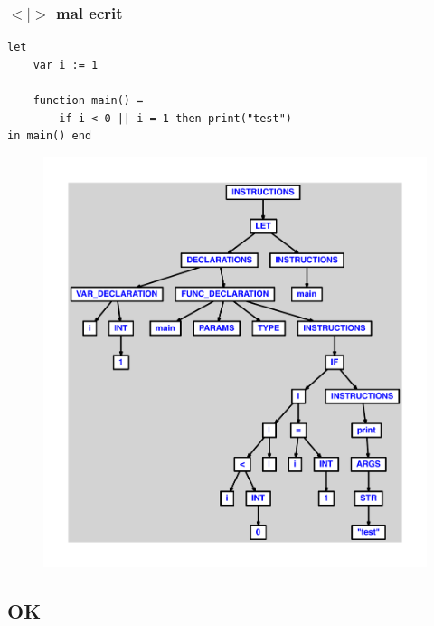 \documentclass{article}
\begin{document}
\subsubsection{$ < $$ | $$ > $ mal ecrit}
\begin{lstlisting}
let
	var i := 1

	function main() =
		if i < 0 || i = 1 then print("test")
in main() end
\end{lstlisting}
\newpage
\begin{figure}[H]
\centering
\includegraphics[max width=\textwidth]{ast/ast_281.pdf}
\end{figure}
\newpage
\subsection{OK}
\end{document}
